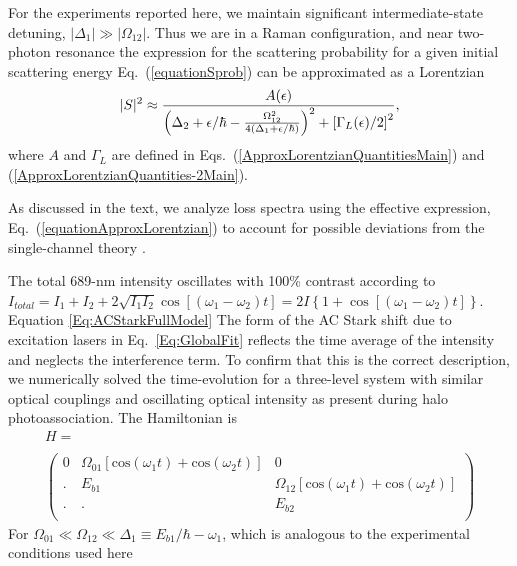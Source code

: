 
For the experiments reported here, we maintain significant intermediate-state detuning, $|\Delta_1|\gg |\Omega_{12}|$. Thus we are in a Raman configuration, and near two-photon resonance the expression for the scattering probability for a given initial scattering energy Eq.~(\ref{equationSprob}) can be approximated as a Lorentzian
\begin{eqnarray}\label{equationSprobLorentzian}
 \vert S\vert^2 \approx {A(\epsilon) \over
 \left(\Delta_2+\epsilon/\hbar-\frac{\Omega_{12}^{2}}{4(\Delta_1+\epsilon/\hbar)}\right)^2+\left[ {\Gamma_L(\epsilon)}/{2}\right]^2},
\end{eqnarray}
where $A$ and $\Gamma_L$ are defined in Eqs.\ (\ref{ApproxLorentzianQuantitiesMain}) and (\ref{ApproxLorentzianQuantities-2Main}).

As discussed in the text, we analyze loss spectra using the effective expression, Eq.\ (\ref{equationApproxLorentzian}) to account for possible deviations from the single-channel theory \cite{bju96}.

\label{App:ACStark}
The total 689-nm intensity oscillates with 100\% contrast according to
$I_{total}=I_1+I_2+2\sqrt{I_1I_2}\cos \left[(\omega_1-\omega_2)t \right]=2I\left\{1+\cos \left[(\omega_1-\omega_2)t \right]\right\}$.
Equation \ref{Eq:ACStarkFullModel}
The form of the AC Stark shift
due to excitation lasers in Eq.\ \ref{Eq:GlobalFit}
 reflects the time average of the intensity and neglects the interference term. To confirm that this is the correct description, we numerically solved the time-evolution for a three-level system with similar optical couplings and oscillating optical intensity as present during halo photoassociation. The Hamiltonian is
\begin{eqnarray}\label{Eq:ThreeLevelHamiltonian}
H= \hspace{3in} \\
 \nonumber\\
\left(
    \begin{array}{ccc}
      0 & \Omega_{01}\left[\mathrm{cos}(\omega_1 t)+ \mathrm{cos}(\omega_2 t)\right] & 0 \\
      . & E_{b1} & \Omega_{12}\left[\mathrm{cos}(\omega_1 t)+ \mathrm{cos}(\omega_2 t)\right] \\
      . & . & E_{b2} \\
    \end{array}
  \right)
\nonumber
\end{eqnarray}
For  $\Omega_{01}\ll \Omega_{12} \ll \Delta_{1}\equiv E_{b1}/\hbar-\omega_1$, which is analogous to the  experimental conditions used here

